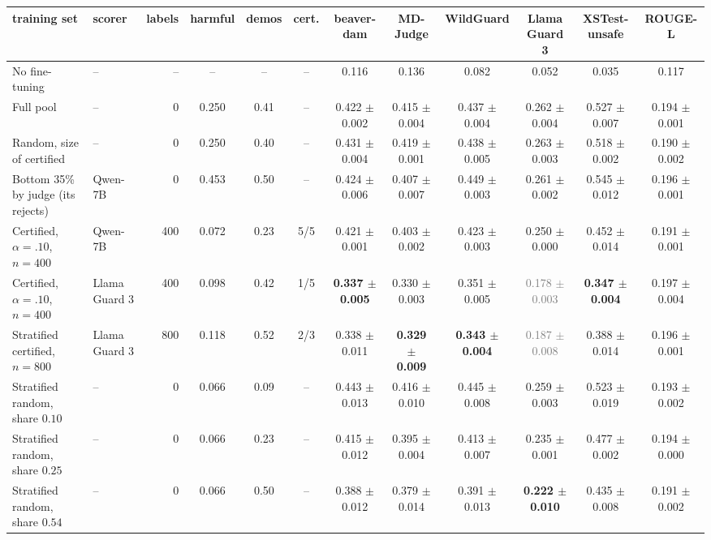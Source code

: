 \begin{tabular}{llrccccccccc}
\toprule
training set & scorer & labels & harmful & demos & cert. & beaver-dam & MD-Judge & WildGuard & Llama Guard 3 & XSTest-unsafe & ROUGE-L \\
\midrule
No fine-tuning & -- & -- & -- & -- & -- & 0.116 & 0.136 & 0.082 & 0.052 & 0.035 & 0.117 \\
Full pool & -- & 0 & 0.250 & 0.41 & -- & 0.422 $\pm$ 0.002 & 0.415 $\pm$ 0.004 & 0.437 $\pm$ 0.004 & 0.262 $\pm$ 0.004 & 0.527 $\pm$ 0.007 & 0.194 $\pm$ 0.001 \\
Random, size of certified & -- & 0 & 0.250 & 0.40 & -- & 0.431 $\pm$ 0.004 & 0.419 $\pm$ 0.001 & 0.438 $\pm$ 0.005 & 0.263 $\pm$ 0.003 & 0.518 $\pm$ 0.002 & 0.190 $\pm$ 0.002 \\
Bottom 35\% by judge (its rejects) & Qwen-7B & 0 & 0.453 & 0.50 & -- & 0.424 $\pm$ 0.006 & 0.407 $\pm$ 0.007 & 0.449 $\pm$ 0.003 & 0.261 $\pm$ 0.002 & 0.545 $\pm$ 0.012 & 0.196 $\pm$ 0.001 \\
Certified, $\alpha{=}.10$, $n{=}400$ & Qwen-7B & 400 & 0.072 & 0.23 & 5/5 & 0.421 $\pm$ 0.001 & 0.403 $\pm$ 0.002 & 0.423 $\pm$ 0.003 & 0.250 $\pm$ 0.000 & 0.452 $\pm$ 0.014 & 0.191 $\pm$ 0.001 \\
Certified, $\alpha{=}.10$, $n{=}400$ & Llama Guard 3 & 400 & 0.098 & 0.42 & 1/5 & \textbf{0.337 $\pm$ 0.005} & 0.330 $\pm$ 0.003 & 0.351 $\pm$ 0.005 & \textcolor{gray}{0.178 $\pm$ 0.003} & \textbf{0.347 $\pm$ 0.004} & 0.197 $\pm$ 0.004 \\
Stratified certified, $n{=}800$ & Llama Guard 3 & 800 & 0.118 & 0.52 & 2/3 & 0.338 $\pm$ 0.011 & \textbf{0.329 $\pm$ 0.009} & \textbf{0.343 $\pm$ 0.004} & \textcolor{gray}{0.187 $\pm$ 0.008} & 0.388 $\pm$ 0.014 & 0.196 $\pm$ 0.001 \\
Stratified random, share $0.10$ & -- & 0 & 0.066 & 0.09 & -- & 0.443 $\pm$ 0.013 & 0.416 $\pm$ 0.010 & 0.445 $\pm$ 0.008 & 0.259 $\pm$ 0.003 & 0.523 $\pm$ 0.019 & 0.193 $\pm$ 0.002 \\
Stratified random, share $0.25$ & -- & 0 & 0.066 & 0.23 & -- & 0.415 $\pm$ 0.012 & 0.395 $\pm$ 0.004 & 0.413 $\pm$ 0.007 & 0.235 $\pm$ 0.001 & 0.477 $\pm$ 0.002 & 0.194 $\pm$ 0.000 \\
Stratified random, share $0.54$ & -- & 0 & 0.066 & 0.50 & -- & 0.388 $\pm$ 0.012 & 0.379 $\pm$ 0.014 & 0.391 $\pm$ 0.013 & \textbf{0.222 $\pm$ 0.010} & 0.435 $\pm$ 0.008 & 0.191 $\pm$ 0.002 \\
\bottomrule
\end{tabular}
